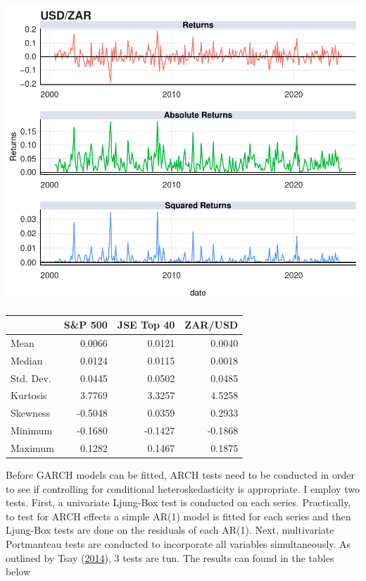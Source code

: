 \documentclass[11pt,preprint, authoryear]{elsarticle}
\let\origfigure\figure
\let\endorigfigure\endfigure
\renewenvironment{figure}[1][2] {
    \expandafter\origfigure\expandafter[H]
} {
    \endorigfigure
}
\let\origtable\table
\let\endorigtable\endtable
\renewenvironment{table}[1][2] {
    \expandafter\origtable\expandafter[H]
} {
    \endorigtable
}
\numberwithin{equation}{section}
\numberwithin{figure}{section}
\numberwithin{table}{section}
\begin{document}
\begin{figure}[H]

{\centering \includegraphics{Template_files/figure-latex/Figure3-1} 

}

\caption{ZAR/USD Returns \label{Figure3}}\label{fig:Figure3}
\end{figure}

\begin{table}[H]
\centering
\caption{Summary Statistics \label{tab1}} 
\begin{tabular}{lrrr}
  \hline
 & S\&P 500 & JSE Top 40 & ZAR/USD \\ 
  \hline
Mean & 0.0066 & 0.0121 & 0.0040 \\ 
  Median & 0.0124 & 0.0115 & 0.0018 \\ 
  Std. Dev. & 0.0445 & 0.0502 & 0.0485 \\ 
  Kurtosis & 3.7769 & 3.3257 & 4.5258 \\ 
  Skewness & -0.5048 & 0.0359 & 0.2933 \\ 
  Minimum & -0.1680 & -0.1427 & -0.1868 \\ 
  Maximum & 0.1282 & 0.1467 & 0.1875 \\ 
   \hline
\end{tabular}
\end{table}

Before GARCH models can be fitted, ARCH tests need to be conducted in
order to see if controlling for conditional heteroskedasticity is
appropriate. I employ two tests. First, a univariate Ljung-Box test is
conducted on each series. Practically, to test for ARCH effects a simple
AR(1) model is fitted for each series and then Ljung-Box tests are done
on the residuals of each AR(1). Next, multivariate Portmanteau tests are
conducted to incorporate all variables simultaneously. As outlined by
Tsay (\protect\hyperlink{ref-Tsay2014}{2014}), 3 tests are tun. The
results can found in the tables below
\end{document}
